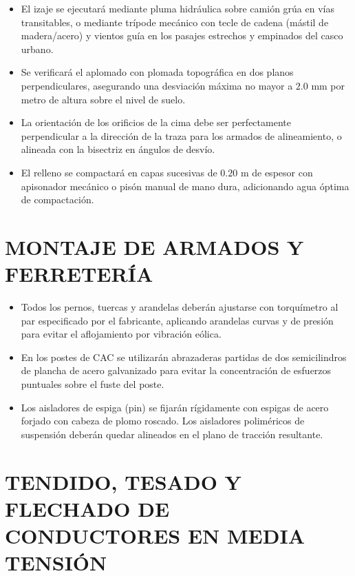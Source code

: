 \begin{itemize}
  \item El izaje se ejecutará mediante pluma hidráulica sobre camión grúa en vías transitables, o mediante trípode mecánico con tecle de cadena (mástil de madera/acero) y vientos guía en los pasajes estrechos y empinados del casco urbano.
  \item Se verificará el aplomado con plomada topográfica en dos planos perpendiculares, asegurando una desviación máxima no mayor a $2.0\text{ mm}$ por metro de altura sobre el nivel de suelo.
  \item La orientación de los orificios de la cima debe ser perfectamente perpendicular a la dirección de la traza para los armados de alineamiento, o alineada con la bisectriz en ángulos de desvío.
  \item El relleno se compactará en capas sucesivas de $0.20\text{ m}$ de espesor con apisonador mecánico o pisón manual de mano dura, adicionando agua óptima de compactación.
\end{itemize}

\section{MONTAJE DE ARMADOS Y FERRETERÍA}

\begin{itemize}
  \item Todos los pernos, tuercas y arandelas deberán ajustarse con torquímetro al par especificado por el fabricante, aplicando arandelas curvas y de presión para evitar el aflojamiento por vibración eólica.
  \item En los postes de CAC se utilizarán abrazaderas partidas de dos semicilindros de plancha de acero galvanizado para evitar la concentración de esfuerzos puntuales sobre el fuste del poste.
  \item Los aisladores de espiga (pin) se fijarán rígidamente con espigas de acero forjado con cabeza de plomo roscado. Los aisladores poliméricos de suspensión deberán quedar alineados en el plano de tracción resultante.
\end{itemize}

\section{TENDIDO, TESADO Y FLECHADO DE CONDUCTORES EN MEDIA TENSIÓN}

